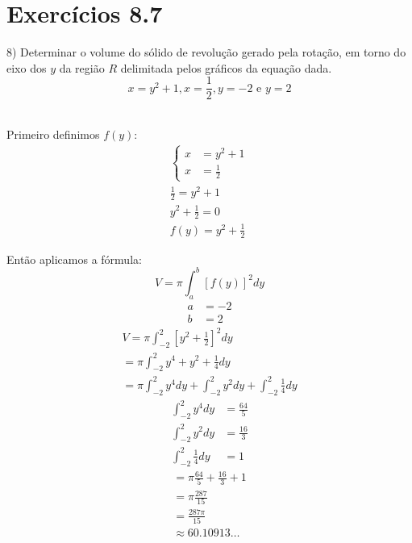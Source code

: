 \documentclass[a4paper,times,12pt]{article}
\begin{document}
\section{Exerc\'{i}cios 8.7}
\hspace*{+15pt} 8) Determinar o volume do sólido de revolução gerado pela rotação, em torno do eixo dos \( y \) da região \( R \) delimitada pelos gráficos da equação dada.
\[ x=y^2+1,x=\frac{1}{2},y=-2\text{ e }y=2 \]
\\
\par Primeiro definimos \(f(y)\):
\begin{gather*}
	\begin{cases}
		x&=y^2+1 \\
		x&=\frac{1}{2}
	\end{cases} \\
	\frac{1}{2}=y^2+1 \\
	y^2+\frac{1}{2}=0 \\
	f(y)=y^2+\frac{1}{2}
\end{gather*}
\par Então aplicamos a fórmula:
\[
	V=\pi\int_a^b[f(y)]^2dy
\]
\begin{align*}
	a&=-2 \\
	b&=2
\end{align*}
\begin{gather*}
	V=\pi \int_{-2}^2[y^2+\frac{1}{2}]^2dy \\
	=\pi \int _{-2}^2y^4+y^2+\frac{1}{4}dy \\
	=\pi \int _{-2}^2y^4dy+\int _{-2}^2y^2dy+\int _{-2}^2\frac{1}{4}dy
\end{gather*}
\begin{align*}
	\int _{-2}^2y^4dy&=\frac{64}{5} \\
	\int _{-2}^2y^2dy&=\frac{16}{3} \\
	\int _{-2}^2\frac{1}{4}dy&=1
\end{align*}
\begin{gather*}
	=\pi \frac{64}{5}+\frac{16}{3}+1 \\
	=\pi \frac{287}{15} \\
	=\frac{287\pi }{15} \\
	\approx 60.10913\dots 
\end{gather*}
\newpage
\end{document}
